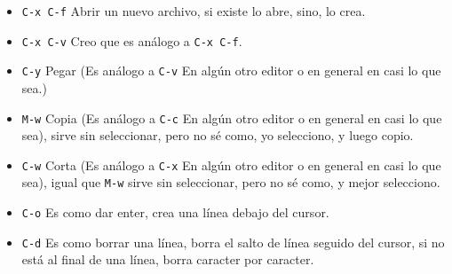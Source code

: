 \documentclass[spanish,12pt,letterpaper]{article}
\begin{document}
\begin{itemize}
\begin{itemize}
  \item \texttt{C-x C-f} Abrir un nuevo archivo, si existe lo abre, sino, lo
    crea.
  \item \texttt{C-x C-v} Creo que es análogo a \texttt{C-x C-f}.
  \item \texttt{C-y} Pegar (Es análogo a \texttt{C-v} En algún otro editor o en
    general en casi lo que sea.)
  \item \texttt{M-w} Copia (Es análogo a \texttt{C-c} En algún otro editor o en
    general en casi lo que sea), sirve sin seleccionar, pero no sé como, yo
    selecciono, y luego copio.
  \item \texttt{C-w} Corta (Es análogo a \texttt{C-x} En algún otro editor o en
    general en casi lo que sea), igual que \texttt{M-w} sirve sin seleccionar,
    pero no sé como, y mejor selecciono.
  \item \texttt{C-o} Es como dar enter, crea una línea debajo del cursor.
  \item \texttt{C-d} Es como borrar una línea, borra el salto de línea seguido
    del cursor, si no está al final de una línea, borra caracter por caracter.
    

\end{itemize}
\end{itemize}
\end{document}
